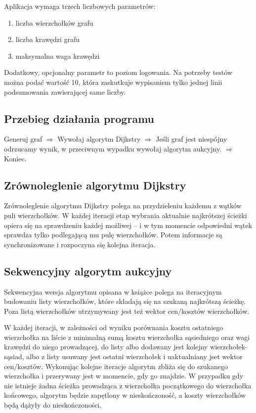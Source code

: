 \documentclass {article}
\begin{document}
Aplikacja wymaga trzech liczbowych parametrów:

\begin{enumerate}
 \item liczba wierzchołków grafu
 \item liczba krawędzi grafu
 \item maksymalna waga krawędzi
\end{enumerate}

Dodatkowy, opcjonalny parametr to poziom logowania. Na potrzeby testów można podać wartość 10, która zaskutkuje wypisaniem tylko jednej linii podsumowania zawierającej same liczby.

\subsection{Przebieg działania programu}

Generuj graf $\Rightarrow$ Wywołaj algorytm Dijkstry $\Rightarrow$ Jeśli graf jest niespójny odrzucamy wynik, w przeciwnym wypadku wywołaj algorytm aukcyjny. $\Rightarrow$ Koniec.

\subsection{Zrównoleglenie algorytmu Dijkstry}

Zrównoleglenie algorytmu Dijkstry polega na przydzieleniu każdemu z wątków puli wierzchołków. W każdej iteracji etap wybrania aktualnie najkrótszej ścieżki opiera się na sprawdzeniu każdej możliwej -- i w tym momencie odpowiedni wątek sprawdza tylko podlegającą mu pulę wierzchołków. Potem informacje są synchronizowane i rozpoczyna się kolejna iteracja.

\subsection{Sekwencyjny algorytm aukcyjny}

Sekwencyjna wersja algorytmu opisana w książce \cite{Bertsekas1998} polega na iteracyjnym budowaniu listy wierzchołków, które składają się na szukaną najkrótszą ścieżkę. Poza listą wierzchołków utrzymywany jest też wektor cen/kosztów wierzchołków.

W każdej iteracji, w zależności od wyniku porównania kosztu ostatniego wierzchołka na liście z minimalną sumą kosztu wierzchołka sąsiedniego oraz wagi krawędzi do niego prowadzącej, do listy albo dodawany jest kolejny wierzchołek-sąsiad, albo z listy usuwany jest ostatni wierzchołek i uaktualniany jset wektor cen/kosztów. Wykonując kolejne iteracje algorytm zbliża się do szukanego wierzchołka i przerywany jest w momencie, gdy go znajdzie. W przypadku gdy nie istnieje żadna ścieżka prowadząca z wierzchołka początkowego do wierzchołka końcowego, algorytm będzie zapętlony w nieskończoność, a koszty wierzchołków będą dążyły do nieskończoności.
\end{document}
